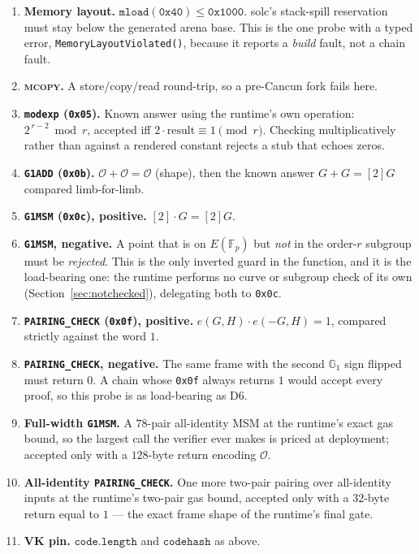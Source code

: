 \documentclass[11pt,a4paper]{article}
\newcommand{\Fp}{\ensuremath{\mathbb{F}_{p}}}
\newcommand{\Gone}{\ensuremath{\mathbb{G}_{1}}}
\newcommand{\Ident}{\ensuremath{\mathcal{O}}}
\newcommand{\pair}{\ensuremath{e}}
\newcommand{\code}[1]{\texttt{#1}}
\newcommand{\err}[1]{\textcolor{red!60!black}{\texttt{#1}}}
\newcommand{\opc}[1]{\textsc{#1}}
\theoremstyle{definition}
\begin{document}
\begin{enumerate}[label=\textbf{D\arabic*.},leftmargin=2.2cm]
\item \textbf{Memory layout.} $\code{mload}(\mathtt{0x40}) \le \mathtt{0x1000}$.
      solc's stack-spill reservation must stay below the generated arena base.
      This is the one probe with a typed error, \err{MemoryLayoutViolated()},
      because it reports a \emph{build} fault, not a chain fault.
\item \textbf{\opc{mcopy}.} A store/copy/read round-trip, so a pre-Cancun fork
      fails here.
\item \textbf{\code{modexp} (\code{0x05}).} Known answer using the runtime's own
      operation: $2^{\,r-2} \bmod r$, accepted iff
      $2\cdot\mathrm{result} \equiv 1 \pmod r$. Checking multiplicatively
      rather than against a rendered constant rejects a stub that echoes zeros.
\item \textbf{\code{G1ADD} (\code{0x0b}).} $\Ident+\Ident=\Ident$ (shape), then
      the known answer $G+G=[2]G$ compared limb-for-limb.
\item \textbf{\code{G1MSM} (\code{0x0c}), positive.} $[2]\cdot G = [2]G$.
\item \textbf{\code{G1MSM}, negative.} A point that is on $E(\Fp)$ but
      \emph{not} in the order-$r$ subgroup must be \emph{rejected}. This is the
      only inverted guard in the function, and it is the load-bearing one:
      the runtime performs no curve or subgroup check of its own
      (Section~\ref{sec:notchecked}), delegating both to \code{0x0c}.
\item \textbf{\code{PAIRING\_CHECK} (\code{0x0f}), positive.}
      $\pair(G,H)\cdot \pair(-G,H)=1$, compared strictly against the word $1$.
\item \textbf{\code{PAIRING\_CHECK}, negative.} The same frame with the second
      $\Gone$ sign flipped must return $0$. A chain whose \code{0x0f} always
      returns $1$ would accept every proof, so this probe is as load-bearing
      as D6.
\item \textbf{Full-width \code{G1MSM}.} A $78$-pair all-identity MSM at the
      runtime's exact gas bound, so the largest call the verifier ever makes is
      priced at deployment; accepted only with a $128$-byte return encoding
      $\Ident$.
\item \textbf{All-identity \code{PAIRING\_CHECK}.} One more two-pair pairing
      over all-identity inputs at the runtime's two-pair gas bound, accepted
      only with a $32$-byte return equal to $1$ --- the exact frame shape of
      the runtime's final gate.
\item \textbf{VK pin.} $\code{code.length}$ and $\code{codehash}$ as above.
\end{enumerate}
\end{document}
